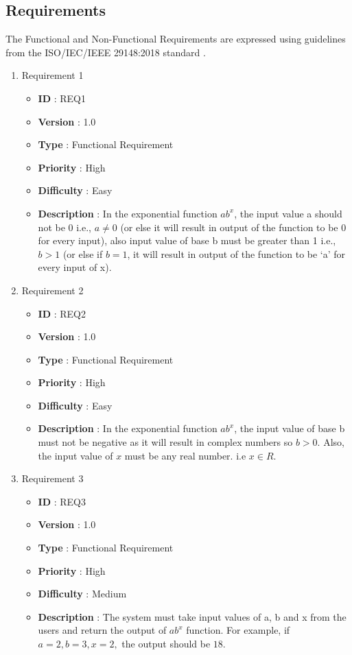 \documentclass[12pt, a4paper]{article}
\begin{document}
\subsection{Requirements}
The Functional and Non-Functional Requirements are expressed using guidelines from the ISO/IEC/IEEE 29148:2018 standard \cite{Requirements Engineering}.
\begin{enumerate}
    \item{} Requirement 1
        \begin{itemize}
        \item \textbf{ID} : REQ1
        \item \textbf{Version} : 1.0
        \item \textbf{Type} : Functional Requirement
        \item \textbf{Priority} : High
        \item \textbf{Difficulty} : Easy
        \item \textbf{Description} : In the exponential function $ ab^x $, the input value a should not be 0 i.e., $ a \neq 0 $ (or else it will result in output of the function to be 0 for every input), also input value of base b must be greater than 1 i.e., $ b > 1 $ (or else if $b = 1 $, it will result in output of the function to be ‘a’ for every input of x).
        \end{itemize}
    
    \item{} Requirement 2
        \begin{itemize}
        \item \textbf{ID} : REQ2
        \item \textbf{Version} : 1.0
        \item \textbf{Type} : Functional Requirement
        \item \textbf{Priority} : High
        \item \textbf{Difficulty} : Easy
        \item \textbf{Description} : In the exponential function $ab^x$, the input value of base b must not be negative as it will result in complex numbers so $b > 0$. Also, the input value of $x$ must be any real number. i.e $x \in R$.
        \end{itemize}
    
    
    \item{} Requirement 3
        \begin{itemize}
        \item \textbf{ID} : REQ3
        \item \textbf{Version} : 1.0
        \item \textbf{Type} : Functional Requirement
        \item \textbf{Priority} : High
        \item \textbf{Difficulty} : Medium
        \item \textbf{Description} : The system must take input values of a, b and x from the users and return the output of $ab^x$ function. For example, if $ a = 2, b = 3 , x = 2,$ the output should be $ 18 $.
        \end{itemize}
        

\end{enumerate}
\end{document}

